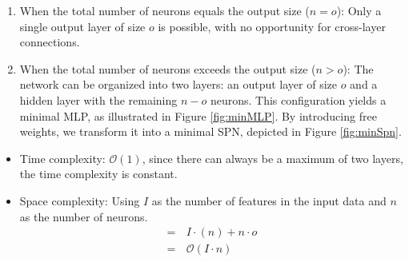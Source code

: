 \begin{enumerate}
    \item When the total number of neurons equals the output size ($n = o$): Only a single output layer of size $o$ is possible, with no opportunity for cross-layer connections.
    \item When the total number of neurons exceeds the output size ($n > o$): The network can be organized into two layers: an output layer of size $o$ and a hidden layer with the remaining $n-o$ neurons. This configuration yields a minimal MLP, as illustrated in Figure \ref{fig:minMLP}. By introducing free weights, we transform it into a minimal SPN, depicted in Figure \ref{fig:minSpn}.
\end{enumerate}

\begin{itemize}
    \item Time complexity: $\mathcal{O}(1)$, since there can always be a maximum of two layers, the time complexity is constant.
    \item Space complexity: Using $I$ as the number of features in the input data and $n$ as the number of neurons.
    \begin{align*}
    =\, & I \cdot (n) + n \cdot o \\
    =\, & \mathcal{O}(I \cdot n)
    \end{align*}
\end{itemize}

